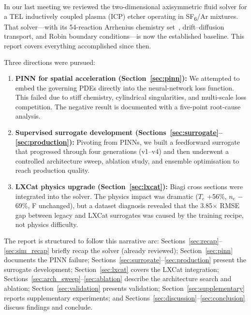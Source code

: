 \documentclass[12pt,a4paper]{article}
\begin{document}
In our last meeting we reviewed the two-dimensional axisymmetric fluid
solver for a TEL inductively coupled plasma (ICP) etcher operating in
SF\textsubscript{6}/Ar mixtures.  That solver---with its 54-reaction
Arrhenius chemistry set~\citep{lallement2009}, drift--diffusion
transport, and Robin boundary conditions---is now the established
baseline.  This report covers everything accomplished since then.

Three directions were pursued:
\begin{enumerate}
  \item \textbf{PINN for spatial acceleration
        (Section~\ref{sec:pinn}):} We attempted to embed the governing
        PDEs directly into the neural-network loss function.  This
        failed due to stiff chemistry, cylindrical singularities, and
        multi-scale loss competition.  The negative result is
        documented with a five-point root-cause analysis.
  \item \textbf{Supervised surrogate development
        (Sections~\ref{sec:surrogate}--\ref{sec:production}):}
        Pivoting from PINNs, we built a feedforward surrogate that
        progressed through four generations (v1--v4) and then underwent
        a controlled architecture sweep, ablation study, and ensemble
        optimisation to reach production quality.
  \item \textbf{LXCat physics upgrade
        (Section~\ref{sec:lxcat}):} Biagi cross sections were
        integrated into the solver.  The physics impact was dramatic
        ($T_e$ +56\%, $n_e$ $-$69\%, F unchanged), but a dataset
        diagnosis revealed that the 3.85$\times$ RMSE gap between
        legacy and LXCat surrogates was caused by the training recipe,
        not physics difficulty.
\end{enumerate}

The report is structured to follow this narrative arc:
Sections~\ref{sec:recap}--\ref{sec:sim_recap} briefly recap the
solver (already reviewed); Section~\ref{sec:pinn} documents the PINN
failure; Sections~\ref{sec:surrogate}--\ref{sec:production} present
the surrogate development; Section~\ref{sec:lxcat} covers the LXCat
integration; Sections~\ref{sec:arch_sweep}--\ref{sec:ablation}
describe the architecture search and ablation;
Section~\ref{sec:validation} presents validation;
Section~\ref{sec:supplementary} reports supplementary experiments; and
Sections~\ref{sec:discussion}--\ref{sec:conclusion} discuss findings
and conclude.

\end{document}
